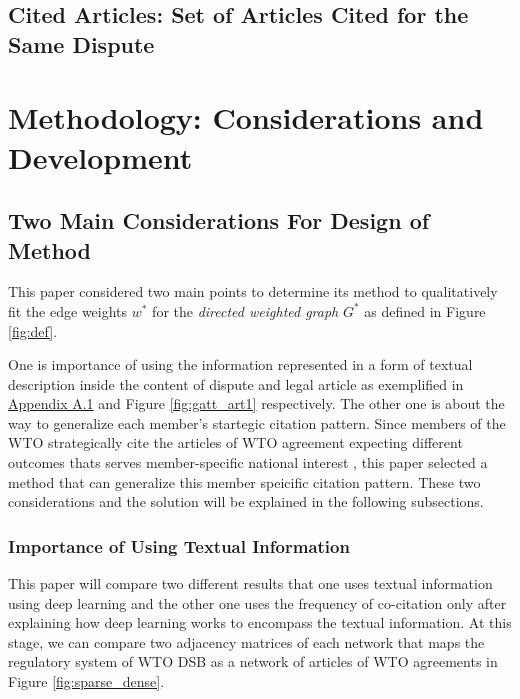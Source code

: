 \documentclass[12pt,letterpaper]{article}
\begin{document}
\subsection{Cited Articles: Set of Articles Cited for the Same Dispute}


\section{Methodology: Considerations and Development}


\subsection{Two Main Considerations For Design of Method}
This paper considered two main points to
determine its method to qualitatively fit the edge weights $w^*$ for the \textit{directed weighted graph} $G^*$ as defined in Figure \ref{fig:def}.

One is importance of using the information represented in a form of textual description inside the content of dispute and legal article as exemplified in \hyperref[sub:factual-aspect-example]{Appendix A.1} and Figure {\ref{fig:gatt_art1}} respectively. The other one is about the way to generalize each member's startegic citation pattern. Since members of the WTO strategically cite 
the articles of WTO agreement expecting different outcomes thats serves member-specific national interest \citep{who_gets, pelc, latent}, this paper
selected a method that can generalize this member speicific citation pattern. These two considerations and the solution will be explained in the following subsections.

\subsubsection{Importance of Using Textual Information}



This paper will compare two different results that one uses textual information using deep learning and the other one
uses the frequency of co-citation only after explaining how deep learning works to encompass the textual information.
At this stage, we can compare two adjacency matrices of each network that maps the regulatory system of WTO DSB as a network of articles of WTO agreements in Figure \ref{fig:sparse_dense}.


\end{document}
